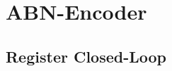 \section{ABN-Encoder}\label{Appendix:ABC_Ecoder}

%
%

%
%
%




\subsection{Register Closed-Loop}\label{Appendix:ABN_Register}

